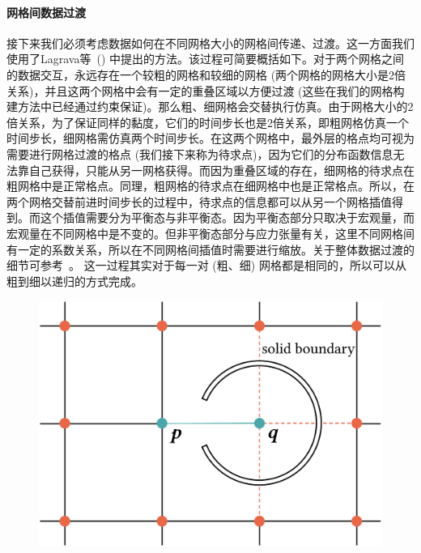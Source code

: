 \paragraph{网格间数据过渡}
接下来我们必须考虑数据如何在不同网格大小的网格间传递、过渡。这一方面我们使用了Lagrava等~(\citeyear{Lagrava-2012}) 中提出的方法。该过程可简要概括如下。对于两个网格之间的数据交互，永远存在一个较粗的网格和较细的网格 (两个网格的网格大小是2倍关系)，并且这两个网格中会有一定的重叠区域以方便过渡 (这些在我们的网格构建方法中已经通过约束保证)。那么粗、细网格会交替执行仿真。由于网格大小的2倍关系，为了保证同样的黏度，它们的时间步长也是2倍关系，即粗网格仿真一个时间步长，细网格需仿真两个时间步长。在这两个网格中，最外层的格点均可视为需要进行网格过渡的格点 (我们接下来称为待求点)，因为它们的分布函数信息无法靠自己获得，只能从另一网格获得。而因为重叠区域的存在，细网格的待求点在粗网格中是正常格点。同理，粗网格的待求点在细网格中也是正常格点。所以，在两个网格交替前进时间步长的过程中，待求点的信息都可以从另一个网格插值得到。而这个插值需要分为平衡态与非平衡态。因为平衡态部分只取决于宏观量，而宏观量在不同网格中是不变的。但非平衡态部分与应力张量有关，这里不同网格间有一定的系数关系，所以在不同网格间插值时需要进行缩放。关于整体数据过渡的细节可参考~\cite{Lagrava-2012}。
这一过程其实对于每一对 (粗、细) 网格都是相同的，所以可以从粗到细以递归的方式完成。

\begin{figure}[htb]
    \centering
      \includegraphics[width=0.7\columnwidth]{figures/propagation.png}
    \label{img:propagation}
\end{figure}

